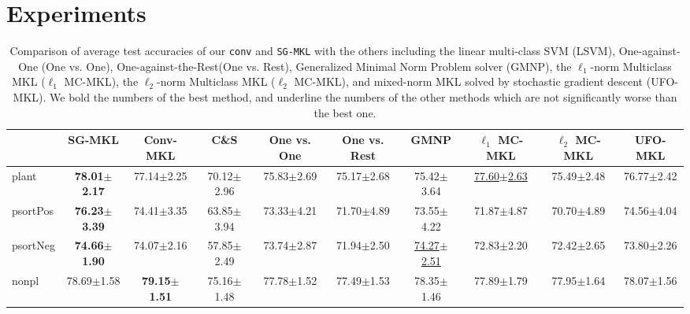 \documentclass{article}
\begin{document}
\section{Experiments}

\begin{table*}[t]
\small
\footnotesize
   \caption{
    \small Comparison of average test accuracies of our \texttt{conv} and \texttt{SG-MKL} with the others including
    the linear multi-class SVM (LSVM),
    One-against-One (One vs. One),
    One-against-the-Rest(One vs. Rest),
    Generalized Minimal Norm Problem solver (GMNP),
    the $\ell_1$-norm Multiclass MKL ($\ell_1$ MC-MKL),
    the $\ell_2$-norm Multiclass MKL ($\ell_2$ MC-MKL),
    and mixed-norm MKL solved by stochastic gradient descent (UFO-MKL).
    We bold the numbers of the best method, and underline the numbers of the other methods
    which are not significantly worse than the best one.
   }
   \label{tabel:accuracy}
    \begin{tabular*}{\linewidth}{@{\extracolsep{-0.25cm}}lccccccccc}
    \toprule
                   & SG-MKL              & Conv-MKL               & C\&S               & One vs. One              & One vs. Rest                                              & GMNP                      & $\ell_1$ MC-MKL          & $\ell_2$ MC-MKL    & UFO-MKL                  \\ \hline
plant              & \textbf{78.01$\pm$2.17}   &77.14$\pm$2.25            & 70.12$\pm$2.96     & 75.83$\pm$2.69           &75.17$\pm$2.68       &75.42$\pm$3.64    & \underline{77.60$\pm$2.63}&75.49$\pm$2.48            &76.77$\pm$2.42\\
psortPos           & \textbf{76.23$\pm$3.39}   &74.41$\pm$3.35            &63.85$\pm$3.94      &73.33$\pm$4.21            &71.70$\pm$4.89       & 73.55$\pm$4.22   &71.87$\pm$4.87             &70.70$\pm$4.89            &74.56$\pm$4.04\\
psortNeg           & \textbf{74.66$\pm$1.90}   &74.07$\pm$2.16            &57.85$\pm$2.49      &73.74$\pm$2.87            &71.94$\pm$2.50   &\underline{74.27$\pm$2.51}   &72.83$\pm$2.20                             &72.42$\pm$2.65      &73.80$\pm$2.26 \\
nonpl              &78.69$\pm$1.58             & \textbf{79.15$\pm$1.51}  &75.16$\pm$1.48      &77.78$\pm$1.52            &77.49$\pm$1.53 &78.35$\pm$1.46    &77.89$\pm$1.79             &77.95$\pm$1.64            &78.07$\pm$1.56\\

\end{tabular*}
\end{table*}
\end{document}
